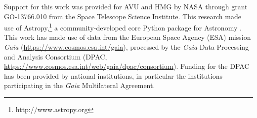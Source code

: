 \documentclass[twocolumn,trackchanges]{aastex63}
\begin{document}
\acknowledgments
Support for this work was provided for AVU and HMG by NASA through
grant GO-13766.010 from the Space Telescope Science Institute. This research made use of Astropy,\footnote{http://www.astropy.org} a community-developed core Python package for Astronomy \citep{2013A&A...558A..33A,2018AJ....156..123A}. 
This work has made use of data from the European Space Agency (ESA) mission
{\it Gaia} (\url{https://www.cosmos.esa.int/gaia}), processed by the {\it Gaia}
Data Processing and Analysis Consortium (DPAC,
\url{https://www.cosmos.esa.int/web/gaia/dpac/consortium}). Funding for the DPAC
has been provided by national institutions, in particular the institutions
participating in the {\it Gaia} Multilateral Agreement.





\end{document}
